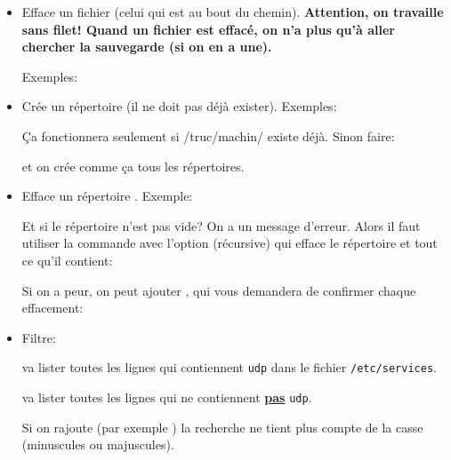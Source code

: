 \begin{itemize}
\item {}

  Efface un fichier (celui qui est au bout du chemin). 
  \small{\textdbend}  \textbf{ Attention, on travaille sans 
    filet! Quand un fichier est effacé, on n'a plus qu'à aller
    chercher la sauvegarde (si on en a une).}

  Exemples:
  
  
  
 \item   {}

   Crée un répertoire (il ne doit pas déjà exister). Exemples:



   Ça fonctionnera seulement si  /truc/machin/ existe déjà. Sinon
   faire:
   

   et on crée comme ça tous les répertoires.
 \item {}

   Efface un répertoire . Exemple:


   Et si le répertoire n'est pas vide? On a un message d'erreur. Alors
   il faut utiliser la 
   commande  avec l'option  (récursive) qui efface le
   répertoire et tout ce qu'il contient:


   Si on a peur, on peut ajouter , qui vous demandera de
   confirmer chaque effacement:


 \item Filtre: 

     va lister toutes les lignes qui
   contiennent \texttt{udp} dans le fichier \texttt{/etc/services}.

     va lister toutes les lignes qui ne
   contiennent \underline{\textbf{\large pas}} \texttt{udp}.

   Si on rajoute  (par exemple ) la recherche ne tient plus compte de la casse
   (minuscules ou majuscules).

\end{itemize}
\exo{}

